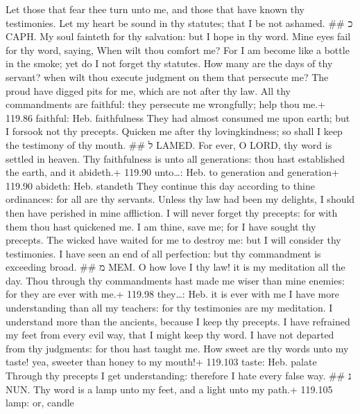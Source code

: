 Let those that fear thee turn unto me, and those that have known thy
testimonies.  Let my heart be sound in thy statutes; that I
be not ashamed. \#\# כ CAPH.  My soul fainteth for thy
salvation: but I hope in thy word.  Mine eyes fail for thy
word, saying, When wilt thou comfort me?  For I am become
like a bottle in the smoke; yet do I not forget thy statutes.
 How many are the days of thy servant? when wilt thou
execute judgment on them that persecute me?  The proud have
digged pits for me, which are not after thy law.  All thy
commandments are faithful: they persecute me wrongfully; help thou me.+
119.86 faithful: Heb. faithfulness  They had almost
consumed me upon earth; but I forsook not thy precepts. 
Quicken me after thy lovingkindness; so shall I keep the testimony of
thy mouth. \#\# ל LAMED.  For ever, O LORD, thy word is
settled in heaven.  Thy faithfulness is unto all
generations: thou hast established the earth, and it abideth.+ 119.90
unto\ldots: Heb. to generation and generation+ 119.90 abideth: Heb.
standeth  They continue this day according to thine
ordinances: for all are thy servants.  Unless thy law had
been my delights, I should then have perished in mine affliction.
 I will never forget thy precepts: for with them thou hast
quickened me.  I am thine, save me; for I have sought thy
precepts.  The wicked have waited for me to destroy me: but
I will consider thy testimonies.  I have seen an end of all
perfection: but thy commandment is exceeding broad. \#\# מ MEM.
 O how love I thy law! it is my meditation all the day.
 Thou through thy commandments hast made me wiser than mine
enemies: for they are ever with me.+ 119.98 they\ldots: Heb. it is ever
with me  I have more understanding than all my teachers:
for thy testimonies are my meditation.  I understand more
than the ancients, because I keep thy precepts.  I have
refrained my feet from every evil way, that I might keep thy word.
 I have not departed from thy judgments: for thou hast
taught me.  How sweet are thy words unto my taste! yea,
sweeter than honey to my mouth!+ 119.103 taste: Heb. palate
 Through thy precepts I get understanding: therefore I
hate every false way. \#\# נ NUN.  Thy word is a lamp unto
my feet, and a light unto my path.+ 119.105 lamp: or, candle
